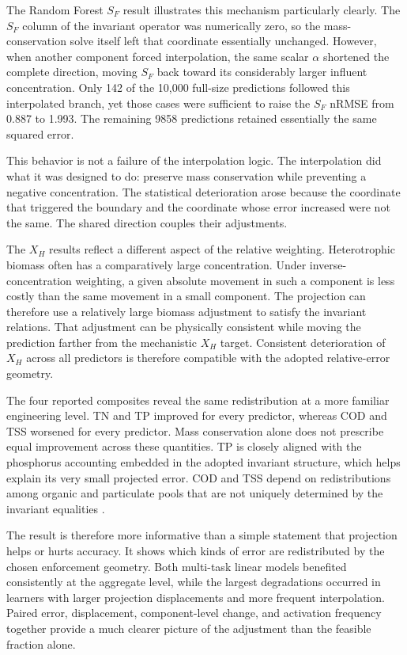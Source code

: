 The Random Forest $S_F$ result illustrates this mechanism particularly clearly. The $S_F$ column of the invariant operator was numerically zero, so the mass-conservation solve itself left that coordinate essentially unchanged. However, when another component forced interpolation, the same scalar $\alpha$ shortened the complete direction, moving $S_F$ back toward its considerably larger influent concentration. Only 142 of the 10,000 full-size predictions followed this interpolated branch, yet those cases were sufficient to raise the $S_F$ nRMSE from 0.887 to 1.993. The remaining 9858 predictions retained essentially the same squared error.

This behavior is not a failure of the interpolation logic. The interpolation did what it was designed to do: preserve mass conservation while preventing a negative concentration. The statistical deterioration arose because the coordinate that triggered the boundary and the coordinate whose error increased were not the same. The shared direction couples their adjustments.

The $X_H$ results reflect a different aspect of the relative weighting. Heterotrophic biomass often has a comparatively large concentration. Under inverse-concentration weighting, a given absolute movement in such a component is less costly than the same movement in a small component. The projection can therefore use a relatively large biomass adjustment to satisfy the invariant relations. That adjustment can be physically consistent while moving the prediction farther from the mechanistic $X_H$ target. Consistent deterioration of $X_H$ across all predictors is therefore compatible with the adopted relative-error geometry.

The four reported composites reveal the same redistribution at a more familiar engineering level. TN and TP improved for every predictor, whereas COD and TSS worsened for every predictor. Mass conservation alone does not prescribe equal improvement across these quantities. TP is closely aligned with the phosphorus accounting embedded in the adopted invariant structure, which helps explain its very small projected error. COD and TSS depend on redistributions among organic and particulate pools that are not uniquely determined by the invariant equalities \citep{Henze2006}.

The result is therefore more informative than a simple statement that projection helps or hurts accuracy. It shows which kinds of error are redistributed by the chosen enforcement geometry. Both multi-task linear models benefited consistently at the aggregate level, while the largest degradations occurred in learners with larger projection displacements and more frequent interpolation. Paired error, displacement, component-level change, and activation frequency together provide a much clearer picture of the adjustment than the feasible fraction alone.

